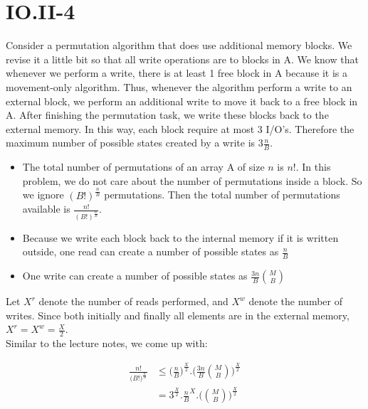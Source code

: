 \section*{IO.II-4}
Consider a permutation algorithm that does use additional memory blocks. We revise it a little bit so that all write operations are 
to blocks in A. We know that whenever we perform a write, there is at least 1 free block in A because it is a movement-only 
algorithm. Thus, whenever the algorithm perform a write to an external block, we perform an additional write to move it back to a
free block in A. After finishing the permutation task, we write these blocks back to the external memory. In this way, each block require at most 3 I/O's. Therefore the maximum number of possible states created by a write is $3\frac{n}{B} $. \\

\begin{itemize} 
  \item The total number of permutations of an array A of size $n$ is $n!$. In this problem, we do not care about the number of 
permutations inside a block. So we ignore $(B!)^{\frac{n}{B} }$ permutations. Then the total number of permutations available is 
$\frac{n!}{(B!)^{\frac{n}{B} }}$.
\item Because we write each block back to the internal memory if it is written outside, one read can create a number of possible states as $\frac{n}{B} $
\item One write can create a number of possible states as $\frac{3n}{B} \binom MB$
\end{itemize}

Let $X^r$ denote the number of reads performed, and $X^w$ denote the number of writes. Since both initially and finally all elements are in the external memory, $X^r = X^w = \frac{X}{2}$. \\ 

Similar to the lecture notes, we come up with:

\begin{equation*}
  \begin{aligned}
  \frac{n!}{\big(B!\big)^{\frac{n}{B}}} &\leq \bigg(\frac{n}{B} \bigg)^{\frac{X}{2}} . \bigg(\frac{3n}{B} \binom MB\bigg)^{\frac{X}{2}} \\
  &= 3^{\frac{X}{2}}.\frac{n}{B}^X.\bigg(\binom MB\bigg)^{\frac{X}{2}} \\
\end{aligned}
\end{equation*}

